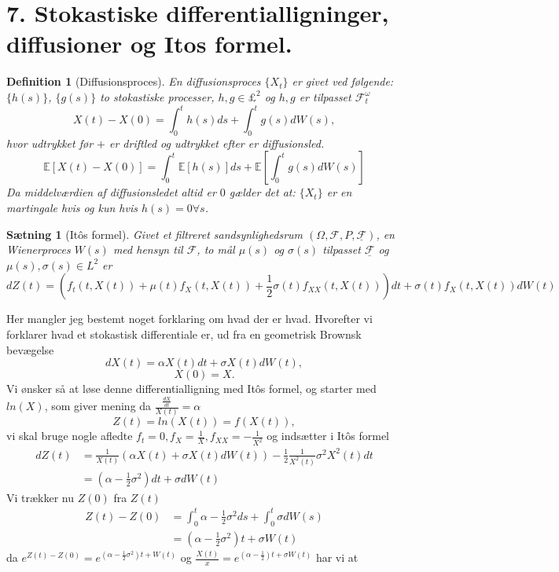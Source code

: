 \documentclass[12pt]{report}
\newtheorem{theorem}[lemma]{Sætning}
\newtheorem{definition}[lemma]{Definition}
\theoremstyle{break}
\theoremstyle{break}
\newcommand{\EE}{\mathbb{E}}
\newcommand{\FI}{\mathcal{F}}
\newcommand{\FIU}{\underline{\mathcal{F}}}
\newcommand{\1}{\mathds{1}}
\begin{document}
\section*{7. Stokastiske differentialligninger, diffusioner og Itos formel.}
\begin{definition}[Diffusionsproces]
	En diffusionsproces $\{X_t\}$ er givet ved følgende: $\{h(s) \}$, $\{ g(s) \}$ to stokastiske processer, $h,g\in \pounds^2$ og $h,g$ er tilpasset $\FI_t^\omega$ \[ X(t)-X(0)=\int_0^t h(s)ds+\int_0^t g(s) dW(s), \] hvor udtrykket før $+$ er driftled og udtrykket efter er diffusionsled.
	\[ \EE\left[  X(t)-X(0) \right] = \int_0^t \EE\left[h(s)\right] ds+\EE\left[\int_0^t g(s) dW(s)\right]\]
	Da middelværdien af diffusionsledet altid er $0$ gælder det at: $\{X_t\}$ er en martingale hvis og kun hvis $h(s)=0\forall s$.
\end{definition}
\begin{theorem}[Itôs formel]
	Givet et  filtreret sandsynlighedsrum $(\Omega, \FI, P, \FIU)$, en Wienerproces $W(s)$ med hensyn til $\FI$, to mål $\mu(s)$ og $\sigma(s)$ tilpasset $\FIU$ og $\mu(s),\sigma(s) \in L^2$ er \[ dZ(t)=\left( f_t(t,X(t))+\mu(t)f_X(t,X(t))+\frac{1}{2}\sigma(t)f_{XX}(t,X(t)) \right)dt+\sigma(t)f_X(t,X(t))dW(t) \]
	
\end{theorem}
Her mangler jeg bestemt noget forklaring om hvad der er hvad. Hvorefter vi forklarer hvad et stokastisk differentiale er, ud fra en geometrisk Brownsk bevægelse \[ dX(t)=\alpha X(t) dt +\sigma X(t) dW(t),\]
\[X(0)=X. \]
Vi ønsker så at løse denne differentialligning med Itôs formel, og starter med $ln(X)$, som giver mening da $\frac{\frac{dX}{dt}}{X(t)}=\alpha$
\[ Z(t)=ln(X(t))=f(X(t)), \] vi skal bruge nogle afledte $f_t=0, f_X=\frac{1}{X}, f_{XX}=-\frac{1}{X^2}$ og indsætter i Itôs formel
\begin{align*}
	dZ(t)&=\frac{1}{X(t)}\left( \alpha X(t) +\sigma X(t) dW(t) \right)-\frac{1}{2}\frac{1}{X^2(t)}\sigma^2X^2(t)dt\\
	&=\left(\alpha-\frac{1}{2}\sigma^2\right)dt+\sigma dW(t)
\end{align*}
Vi trækker nu $Z(0)$ fra $Z(t)$
\begin{align*}
	Z(t)-Z(0)&=\int_{0}^{t}\alpha-\frac{1}{2}\sigma^2ds+\int_{0}^{t}\sigma dW(s)\\
	&=\left( \alpha-\frac{1}{2}\sigma^2 \right)t+\sigma W(t)
\end{align*}
da $e^{Z(t)-Z(0)}=e^{\left(\alpha - \frac{1}{2}\sigma^2\right)t+W(t)}$ og $\frac{X(t)}{x}=e^{\left(\alpha-\frac{1}{2}\right)t+\sigma W(t)}$ har vi at 
\end{document}
